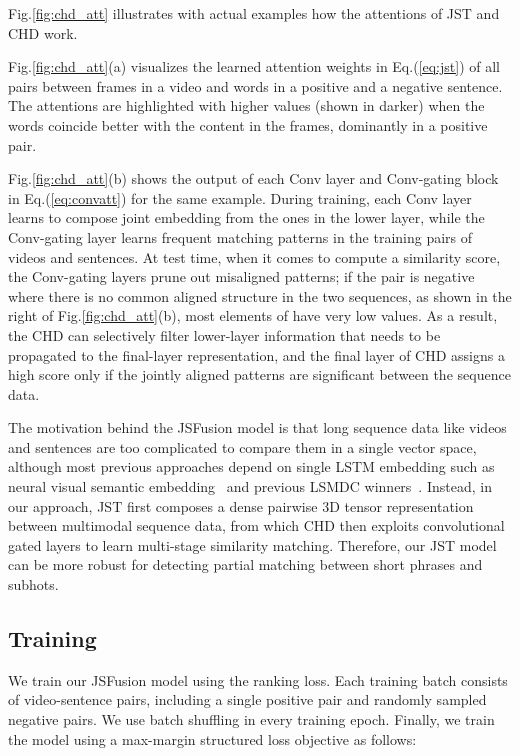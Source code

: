 \documentclass[runningheads]{llncs}
\begin{document}
Fig.\ref{fig:chd_att} illustrates with actual examples how the attentions of JST and CHD work.

Fig.\ref{fig:chd_att}(a) visualizes the learned attention weights  in Eq.(\ref{eq:jst}) of all pairs between frames in a video and words in a positive and a negative sentence.
The attentions are highlighted with higher values (shown in darker) when the words coincide better with the content in the frames, dominantly in a positive pair.

Fig.\ref{fig:chd_att}(b) shows the output  of each Conv layer and Conv-gating block in Eq.(\ref{eq:convatt}) for the same example.
During training, each Conv layer learns to compose joint embedding from the ones in the lower layer, 
while the Conv-gating layer learns frequent matching patterns in the training pairs of videos and sentences.
At test time, when it comes to compute a similarity score, the Conv-gating layers prune out misaligned patterns;
if the pair is negative where there is no common aligned structure in the two sequences, as shown in the right of Fig.\ref{fig:chd_att}(b), 
most elements of  have very low values. 
As a result, the CHD can selectively filter lower-layer information that needs to be propagated to the final-layer representation,
and the final layer of CHD assigns a high score only if the jointly aligned patterns are significant between the sequence data.

The motivation behind the JSFusion model is that long sequence data like videos and sentences are too complicated to compare them in a single vector space,
although most previous approaches depend on single LSTM embedding such as neural visual semantic embedding~\cite{kiros-tacl-2014} and previous LSMDC winners~\cite{kaufman-iccv-2017,yu-cvpr-2017}.
Instead, in our approach, JST first composes a dense pairwise 3D tensor representation between multimodal sequence data, from which CHD then
exploits convolutional gated layers to learn multi-stage similarity matching. Therefore, our JST model can be more robust for detecting partial matching between short phrases and subhots.




\subsection{Training}
\label{subsec:training}

We train our JSFusion model using the ranking loss.
Each training batch consists of  video-sentence pairs, including a single positive pair and  randomly sampled negative pairs.
We use batch shuffling in every training epoch.
Finally, we train the model using a max-margin structured loss objective as follows:
\end{document}
